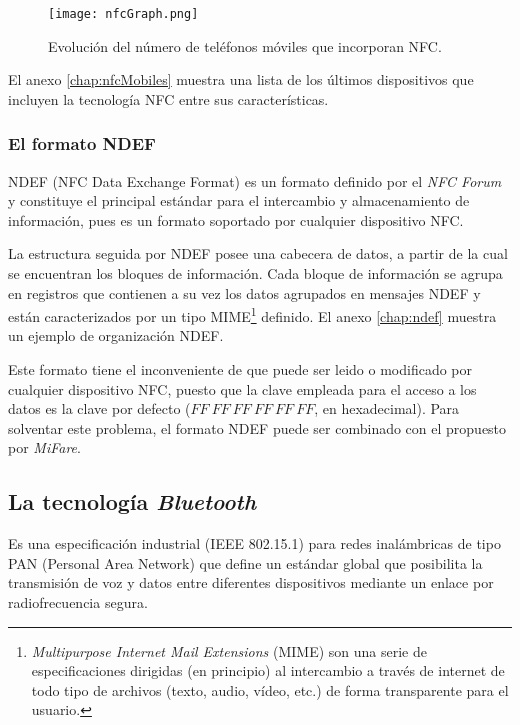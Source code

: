   \begin{figure}[!h]
    \begin{center}
      \texttt{[image: nfcGraph.png]}
      \caption{Evolución del número de teléfonos móviles que
      incorporan \acs{NFC}.}
      \label{fig:nfcGraph}
    \end{center}
  \end{figure}

El anexo \ref{chap:nfcMobiles} muestra una lista de los últimos dispositivos
que incluyen la tecnología \acs{NFC} entre sus características.

  \subsubsection{El formato \acs{NDEF}}
\acs{NDEF} (\acs{NFC} Data Exchange Format) es un formato definido por el
\emph{NFC Forum} y constituye el principal estándar para el intercambio y
almacenamiento de información, pues es un formato soportado por cualquier 
dispositivo \acs{NFC}.

La estructura seguida por \acs{NDEF} posee una cabecera de datos, a partir de
la cual se encuentran los bloques de información. Cada bloque de información
se agrupa en registros que contienen a su vez los datos agrupados en mensajes
\acs{NDEF} y están caracterizados por un tipo \acs{MIME}\footnote{
\emph{Multipurpose Internet Mail Extensions} (\acs{MIME}) son una serie
de especificaciones dirigidas (en principio) al intercambio a través de
internet de todo tipo de archivos (texto, audio, vídeo, etc.) de forma
transparente para el usuario.} definido. El
anexo \ref{chap:ndef} muestra un ejemplo de organización \acs{NDEF}.

Este formato tiene el inconveniente de que puede ser leido o modificado por
cualquier dispositivo \acs{NFC}, puesto que la clave empleada para el acceso
a los datos es la clave por defecto ($FF\ FF\ FF\ FF\ FF\ FF$, en hexadecimal).
Para solventar este problema, el formato \acs{NDEF} puede ser combinado con
el propuesto por \emph{MiFare}.

  \subsection{La tecnología \emph{Bluetooth}}
Es una especificación industrial (\acs{IEEE} 802.15.1) para redes inalámbricas
de tipo \acs{PAN} (Personal Area Network) que define un estándar global que
posibilita la transmisión de voz y datos entre diferentes dispositivos mediante
un enlace por radiofrecuencia segura.

